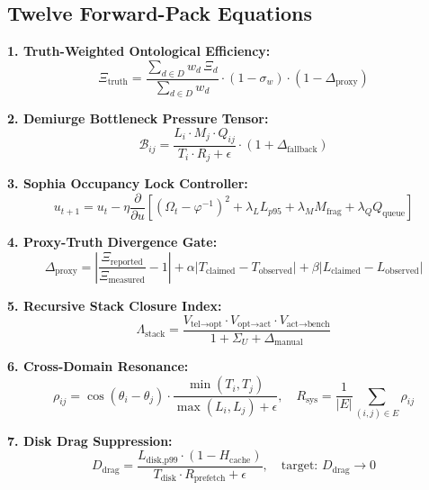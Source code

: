 \documentclass[11pt,a4paper]{article}
\theoremstyle{definition}
\begin{document}
\subsection{Twelve Forward-Pack Equations}

\textbf{1. Truth-Weighted Ontological Efficiency:}
\begin{equation}
\Xi_{\text{truth}} = \frac{\sum_{d\in D} w_d\,\Xi_d}{\sum_{d\in D} w_d}\cdot(1-\sigma_w)\cdot(1-\Delta_{\text{proxy}})
\end{equation}

\textbf{2. Demiurge Bottleneck Pressure Tensor:}
\begin{equation}
\mathcal{B}_{ij} = \frac{L_i\cdot M_j\cdot Q_{ij}}{T_i\cdot R_j + \epsilon}\cdot(1+\Delta_{\text{fallback}})
\end{equation}

\textbf{3. Sophia Occupancy Lock Controller:}
\begin{equation}
u_{t+1} = u_t - \eta\frac{\partial}{\partial u}\left[(\Omega_t-\varphi^{-1})^2 + \lambda_L L_{p95} + \lambda_M M_{\text{frag}} + \lambda_Q Q_{\text{queue}}\right]
\end{equation}

\textbf{4. Proxy-Truth Divergence Gate:}
\begin{equation}
\Delta_{\text{proxy}} = \left|\frac{\Xi_{\text{reported}}}{\Xi_{\text{measured}}} - 1\right| + \alpha|T_{\text{claimed}}-T_{\text{observed}}| + \beta|L_{\text{claimed}}-L_{\text{observed}}|
\end{equation}

\textbf{5. Recursive Stack Closure Index:}
\begin{equation}
\Lambda_{\text{stack}} = \frac{V_{\text{tel}\to\text{opt}}\cdot V_{\text{opt}\to\text{act}}\cdot V_{\text{act}\to\text{bench}}}{1+\Sigma_U+\Delta_{\text{manual}}}
\end{equation}

\textbf{6. Cross-Domain Resonance:}
\begin{equation}
\rho_{ij} = \cos(\theta_i-\theta_j)\cdot\frac{\min(T_i,T_j)}{\max(L_i,L_j)+\epsilon},\quad R_{\text{sys}} = \frac{1}{|E|}\sum_{(i,j)\in E}\rho_{ij}
\end{equation}

\textbf{7. Disk Drag Suppression:}
\begin{equation}
D_{\text{drag}} = \frac{L_{\text{disk,p99}}\cdot(1-H_{\text{cache}})}{T_{\text{disk}}\cdot R_{\text{prefetch}}+\epsilon},\quad\text{target: }D_{\text{drag}}\to 0
\end{equation}
\end{document}
